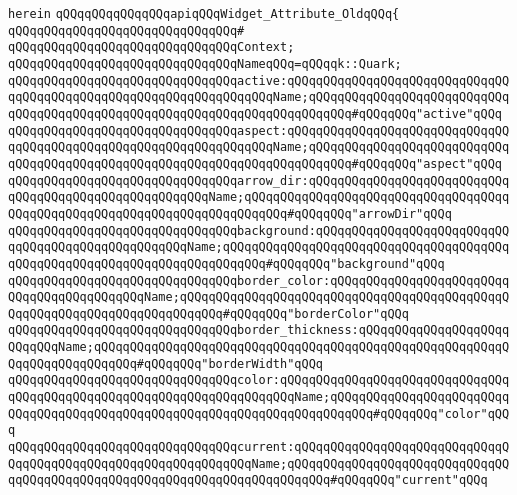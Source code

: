 \verb|herein|\newline
\newline
\verb|qQQqqQQqqQQqqQQqapiqQQqWidget_Attribute_OldqQQq{|\newline
\verb|qQQqqQQqqQQqqQQqqQQqqQQqqQQqqQQq#|\newline
\verb|qQQqqQQqqQQqqQQqqQQqqQQqqQQqqQQqContext;|\newline
\newline
\verb|qQQqqQQqqQQqqQQqqQQqqQQqqQQqqQQqNameqQQq=qQQqqk::Quark;|\newline
\newline
\verb|qQQqqQQqqQQqqQQqqQQqqQQqqQQqqQQqactive:qQQqqQQqqQQqqQQqqQQqqQQqqQQqqQQqqQQqqQQqqQQqqQQqqQQqqQQqqQQqqQQqqQQqName;qQQqqQQqqQQqqQQqqQQqqQQqqQQqqQQqqQQqqQQqqQQqqQQqqQQqqQQqqQQqqQQqqQQqqQQqqQQq#qQQqqQQq"active"qQQq|\newline
\verb|qQQqqQQqqQQqqQQqqQQqqQQqqQQqqQQqaspect:qQQqqQQqqQQqqQQqqQQqqQQqqQQqqQQqqQQqqQQqqQQqqQQqqQQqqQQqqQQqqQQqqQQqName;qQQqqQQqqQQqqQQqqQQqqQQqqQQqqQQqqQQqqQQqqQQqqQQqqQQqqQQqqQQqqQQqqQQqqQQqqQQq#qQQqqQQq"aspect"qQQq|\newline
\verb|qQQqqQQqqQQqqQQqqQQqqQQqqQQqqQQqarrow_dir:qQQqqQQqqQQqqQQqqQQqqQQqqQQqqQQqqQQqqQQqqQQqqQQqqQQqqQQqName;qQQqqQQqqQQqqQQqqQQqqQQqqQQqqQQqqQQqqQQqqQQqqQQqqQQqqQQqqQQqqQQqqQQqqQQqqQQq#qQQqqQQq"arrowDir"qQQq|\newline
\newline
\verb|qQQqqQQqqQQqqQQqqQQqqQQqqQQqqQQqbackground:qQQqqQQqqQQqqQQqqQQqqQQqqQQqqQQqqQQqqQQqqQQqqQQqqQQqName;qQQqqQQqqQQqqQQqqQQqqQQqqQQqqQQqqQQqqQQqqQQqqQQqqQQqqQQqqQQqqQQqqQQqqQQqqQQq#qQQqqQQq"background"qQQq|\newline
\verb|qQQqqQQqqQQqqQQqqQQqqQQqqQQqqQQqborder_color:qQQqqQQqqQQqqQQqqQQqqQQqqQQqqQQqqQQqqQQqqQQqName;qQQqqQQqqQQqqQQqqQQqqQQqqQQqqQQqqQQqqQQqqQQqqQQqqQQqqQQqqQQqqQQqqQQqqQQqqQQq#qQQqqQQq"borderColor"qQQq|\newline
\verb|qQQqqQQqqQQqqQQqqQQqqQQqqQQqqQQqborder_thickness:qQQqqQQqqQQqqQQqqQQqqQQqqQQqName;qQQqqQQqqQQqqQQqqQQqqQQqqQQqqQQqqQQqqQQqqQQqqQQqqQQqqQQqqQQqqQQqqQQqqQQqqQQq#qQQqqQQq"borderWidth"qQQq|\newline
\newline
\verb|qQQqqQQqqQQqqQQqqQQqqQQqqQQqqQQqcolor:qQQqqQQqqQQqqQQqqQQqqQQqqQQqqQQqqQQqqQQqqQQqqQQqqQQqqQQqqQQqqQQqqQQqqQQqName;qQQqqQQqqQQqqQQqqQQqqQQqqQQqqQQqqQQqqQQqqQQqqQQqqQQqqQQqqQQqqQQqqQQqqQQqqQQq#qQQqqQQq"color"qQQq|\newline
\verb|qQQqqQQqqQQqqQQqqQQqqQQqqQQqqQQqcurrent:qQQqqQQqqQQqqQQqqQQqqQQqqQQqqQQqqQQqqQQqqQQqqQQqqQQqqQQqqQQqqQQqName;qQQqqQQqqQQqqQQqqQQqqQQqqQQqqQQqqQQqqQQqqQQqqQQqqQQqqQQqqQQqqQQqqQQqqQQqqQQq#qQQqqQQq"current"qQQq|\newline
